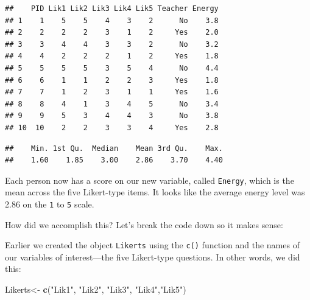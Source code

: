 \documentclass[
]{book}
\newenvironment{Shaded}{\begin{snugshade}}{\end{snugshade}}
\newcommand{\CommentTok}[1]{\textcolor[rgb]{0.56,0.35,0.01}{\textit{#1}}}
\newcommand{\DataTypeTok}[1]{\textcolor[rgb]{0.13,0.29,0.53}{#1}}
\newcommand{\DecValTok}[1]{\textcolor[rgb]{0.00,0.00,0.81}{#1}}
\newcommand{\KeywordTok}[1]{\textcolor[rgb]{0.13,0.29,0.53}{\textbf{#1}}}
\newcommand{\NormalTok}[1]{#1}
\newcommand{\OperatorTok}[1]{\textcolor[rgb]{0.81,0.36,0.00}{\textbf{#1}}}
\newcommand{\StringTok}[1]{\textcolor[rgb]{0.31,0.60,0.02}{#1}}
\begin{document}
\begin{Shaded}
\end{Shaded}

\begin{verbatim}
##    PID Lik1 Lik2 Lik3 Lik4 Lik5 Teacher Energy
## 1    1    5    5    4    3    2      No    3.8
## 2    2    2    2    3    1    2     Yes    2.0
## 3    3    4    4    3    3    2      No    3.2
## 4    4    2    2    2    1    2     Yes    1.8
## 5    5    5    5    3    5    4      No    4.4
## 6    6    1    1    2    2    3     Yes    1.8
## 7    7    1    2    3    1    1     Yes    1.6
## 8    8    4    1    3    4    5      No    3.4
## 9    9    5    3    4    4    3      No    3.8
## 10  10    2    2    3    3    4     Yes    2.8
\end{verbatim}

\begin{Shaded}
\end{Shaded}

\begin{verbatim}
##    Min. 1st Qu.  Median    Mean 3rd Qu.    Max. 
##    1.60    1.85    3.00    2.86    3.70    4.40
\end{verbatim}

Each person now has a score on our new variable, called \texttt{Energy}, which is the mean across the five Likert-type items. It looks like the average energy level was 2.86 on the \texttt{1} to \texttt{5} scale.

How did we accomplish this? Let's break the code down so it makes sense:

Earlier we created the object \texttt{Likerts} using the \texttt{c()} function and the names of our variables of interest---the five Likert-type questions. In other words, we did this:

\begin{Shaded}
\begin{Highlighting}[]
\NormalTok{Likerts<-}\StringTok{ }\KeywordTok{c}\NormalTok{(}\StringTok{"Lik1"}\NormalTok{, }\StringTok{"Lik2"}\NormalTok{, }\StringTok{"Lik3"}\NormalTok{, }\StringTok{"Lik4"}\NormalTok{,}\StringTok{"Lik5"}\NormalTok{)}
\end{Highlighting}
\end{Shaded}
\end{document}
